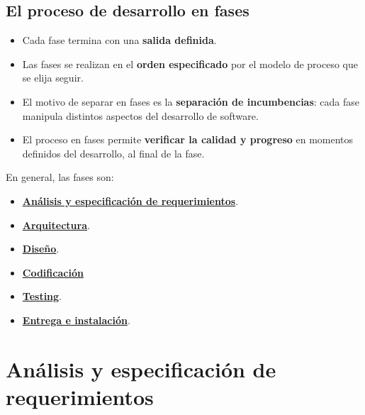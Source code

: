 \subsection{El proceso de desarrollo en fases}

\begin{itemize}
    \item Cada fase termina con una \textbf{salida definida}.
    \item Las fases se realizan en el \textbf{orden especificado} por el modelo de proceso que se elija seguir.
    \item El motivo de separar en fases es la \textbf{separación de incumbencias}: cada fase manipula distintos aspectos del desarrollo de software.
    \item El proceso en fases permite \textbf{verificar la calidad y progreso} en momentos definidos del desarrollo, al final de la fase.
\end{itemize}

En general, las fases son:
\begin{itemize}
    \item \underline{\textbf{Análisis y especificación de requerimientos}}.
    \item \underline{\textbf{Arquitectura}}.
    \item \underline{\textbf{Diseño}}.
    \item \underline{\textbf{Codificación}}
    \item \underline{\textbf{Testing}}.
    \item \underline{\textbf{Entrega e instalación}}.
\end{itemize}

\newpage

\section{Análisis y especificación de requerimientos}